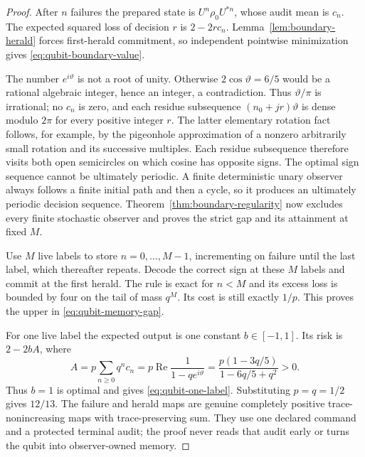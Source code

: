 \begin{proof}
After $n$ failures the prepared state is $U^n\rho_0U^{*n}$, whose audit mean is $c_n$. The expected squared loss of decision $r$ is $2-2rc_n$. Lemma~\ref{lem:boundary-herald} forces first-herald commitment, so independent pointwise minimization gives \eqref{eq:qubit-boundary-value}.

The number $e^{i\vartheta}$ is not a root of unity. Otherwise $2\cos\vartheta=6/5$ would be a rational algebraic integer, hence an integer, a contradiction. Thus $\vartheta/\pi$ is irrational; no $c_n$ is zero, and each residue subsequence $(n_0+jr)\vartheta$ is dense modulo $2\pi$ for every positive integer $r$. The latter elementary rotation fact follows, for example, by the pigeonhole approximation of a nonzero arbitrarily small rotation and its successive multiples. Each residue subsequence therefore visits both open semicircles on which cosine has opposite signs. The optimal sign sequence cannot be ultimately periodic. A finite deterministic unary observer always follows a finite initial path and then a cycle, so it produces an ultimately periodic decision sequence. Theorem~\ref{thm:boundary-regularity} now excludes every finite stochastic observer and proves the strict gap and its attainment at fixed $M$.

Use $M$ live labels to store $n=0,\ldots,M-1$, incrementing on failure until the last label, which thereafter repeats. Decode the correct sign at these $M$ labels and commit at the first herald. The rule is exact for $n<M$ and its excess loss is bounded by four on the tail of mass $q^M$. Its cost is still exactly $1/p$. This proves the upper in \eqref{eq:qubit-memory-gap}.

For one live label the expected output is one constant $b\in[-1,1]$. Its risk is $2-2bA$, where
\[
 A=p\sum_{n\ge0}q^nc_n
   =p\operatorname{Re}\frac1{1-qe^{i\vartheta}}
   =\frac{p(1-3q/5)}{1-6q/5+q^2}>0.
\]
Thus $b=1$ is optimal and gives \eqref{eq:qubit-one-label}. Substituting $p=q=1/2$ gives $12/13$. The failure and herald maps are genuine completely positive trace-nonincreasing maps with trace-preserving sum. They use one declared command and a protected terminal audit; the proof never reads that audit early or turns the qubit into observer-owned memory.
\end{proof}

